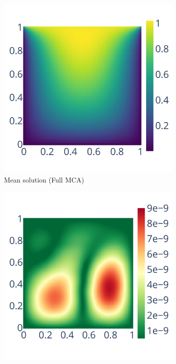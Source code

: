 \documentclass[10pt,journal,compsoc]{IEEEtran}
\begin{document}
\begin{figure}
    \begin{subfigure}{0.45\linewidth}
        \includegraphics[width=\linewidth]{figure/root_finding/solution_mean_MCA.pdf}
        \caption{Mean solution (Full MCA)}
        \label{fig:mean_solution_mca}
    \end{subfigure}
    \begin{subfigure}{0.45\linewidth}
        \includegraphics[width=\linewidth]{figure/root_finding/solution_std_MCA.pdf}

\end{subfigure}
\end{figure}
\end{document}

